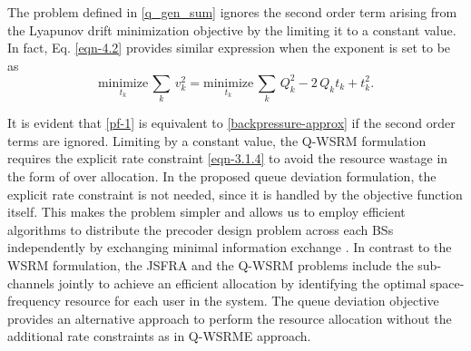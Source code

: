 The problem defined in \eqref{q_gen_sum} ignores the second order term arising from the Lyapunov drift minimization objective by the limiting it to a constant value. In fact, Eq. \eqref{eqn-4.2} provides similar expression when the exponent is set to be  as
\begin{equation}\label{pf-1}
\underset{t_k}{\text{minimize}} \, \sum_k \, v_k^2 = \underset{t_k}{\text{minimize}} \, \sum_k \, Q_k^2 - 2 \, Q_k t_k + t_k^2.
\end{equation}

It is evident that \eqref{pf-1} is equivalent to \eqref{backpressure-approx} if the second order terms are ignored. Limiting  by a constant value, the \ac{Q-WSRM} formulation requires the explicit rate constraint \eqref{eqn-3.1.4} to avoid the resource wastage in the form of over allocation. In the proposed queue deviation formulation, the explicit rate constraint is not needed, since it is handled by the objective function itself. This makes the problem simpler and allows us to employ efficient algorithms to distribute the precoder design problem across each \acp{BS} independently by exchanging minimal information exchange \cite{boyd2011distributed}. In contrast to the \ac{WSRM} formulation, the \ac{JSFRA} and the \ac{Q-WSRM} problems include the sub-channels jointly to achieve an efficient allocation by identifying the optimal space-frequency resource for each user in the system. The queue deviation objective provides an alternative approach to perform the resource allocation without the additional rate constraints as in \ac{Q-WSRME} approach.
